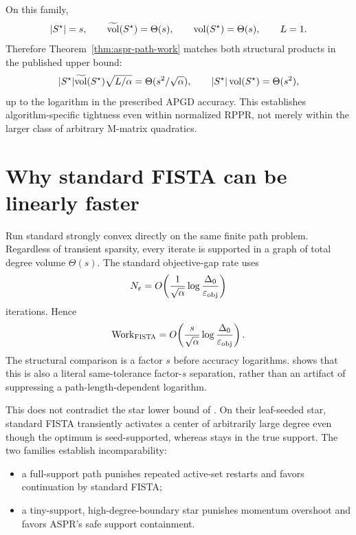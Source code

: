 \documentclass[11pt]{article}
\begin{document}
On this family,
\begin{equation}
 |S^\star|=s,
 \qquad
 \widetilde{\operatorname{vol}}(S^\star)=\Theta(s),
 \qquad
 \operatorname{vol}(S^\star)=\Theta(s),
 \qquad L=1.
 \label{eq:path-parameters}
\end{equation}
Therefore Theorem~\ref{thm:aspr-path-work} matches both structural products in
the published upper bound:
\begin{equation}
 |S^\star|\widetilde{\operatorname{vol}}(S^\star)\sqrt{L/\alpha}
 =\Theta(s^2/\sqrt\alpha),
 \qquad
 |S^\star|\operatorname{vol}(S^\star)=\Theta(s^2),
 \label{eq:matching-products}
\end{equation}
up to the logarithm in the prescribed APGD accuracy.  This establishes
algorithm-specific tightness even within normalized RPPR, not merely within
the larger class of arbitrary M-matrix quadratics.

\section{Why standard FISTA can be linearly faster}
\label{sec:fista-comparison}

Run standard strongly convex \FISTA{} directly on the same finite path
problem.  Regardless of transient sparsity, every iterate is supported in a
graph of total degree volume $\Theta(s)$.  The standard objective-gap rate
uses
\begin{equation}
 N_{\varepsilon}
 =O\!\left(
  \frac1{\sqrt\alpha}
  \log\frac{\Delta_0}{\varepsilon_{\rm obj}}
 \right)
 \label{eq:fista-iterations}
\end{equation}
iterations.  Hence
\begin{equation}
 \operatorname{Work}_{\textsc{FISTA}}
 =O\!\left(
  \frac{s}{\sqrt\alpha}
  \log\frac{\Delta_0}{\varepsilon_{\rm obj}}
 \right).
 \label{eq:fista-path-work}
\end{equation}
The structural comparison is a factor $s$ before accuracy logarithms.
 shows that this is also a literal
same-tolerance factor-$s$ separation, rather than an artifact of suppressing a
path-length-dependent logarithm.

This does not contradict the star lower bound of
\citet{fountoulakis2026}.  On their leaf-seeded star, standard FISTA
transiently activates a center of arbitrarily large degree even though the
optimum is seed-supported, whereas \ASPR{} stays in the true support.  The two
families establish incomparability:
\begin{itemize}[leftmargin=*]
\item a full-support path punishes repeated active-set restarts and favors
      continuation by standard FISTA;
\item a tiny-support, high-degree-boundary star punishes momentum overshoot
      and favors ASPR's safe support containment.
\end{itemize}
\end{document}
